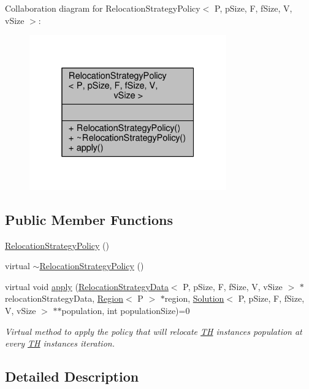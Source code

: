 Collaboration diagram for Relocation\+Strategy\+Policy$<$ P, p\+Size, F, f\+Size, V, v\+Size $>$\+:\nopagebreak
\begin{figure}[H]
\begin{center}
\leavevmode
\includegraphics[width=241pt]{classRelocationStrategyPolicy__coll__graph}
\end{center}
\end{figure}
\subsection*{Public Member Functions}
\begin{DoxyCompactItemize}
\item 
\hyperlink{classRelocationStrategyPolicy_ae5c37f688b1e178d325a5d1901c6b121}{Relocation\+Strategy\+Policy} ()
\item 
virtual \hyperlink{classRelocationStrategyPolicy_ab8c3b00d15e2ab2dd01e52b1a201a068}{$\sim$\+Relocation\+Strategy\+Policy} ()
\item 
virtual void \hyperlink{classRelocationStrategyPolicy_ab1de627ca81a24739d942806cfed27e0}{apply} (\hyperlink{structRelocationStrategyData}{Relocation\+Strategy\+Data}$<$ P, p\+Size, F, f\+Size, V, v\+Size $>$ $\ast$relocation\+Strategy\+Data, \hyperlink{classRegion}{Region}$<$ P $>$ $\ast$region, \hyperlink{classSolution}{Solution}$<$ P, p\+Size, F, f\+Size, V, v\+Size $>$ $\ast$$\ast$population, int population\+Size)=0
\begin{DoxyCompactList}\small\item\em Virtual method to apply the policy that will relocate \hyperlink{classTH}{TH} instance\textquotesingle{}s population at every \hyperlink{classTH}{TH} instance\textquotesingle{}s iteration. \end{DoxyCompactList}\end{DoxyCompactItemize}


\subsection{Detailed Description}
